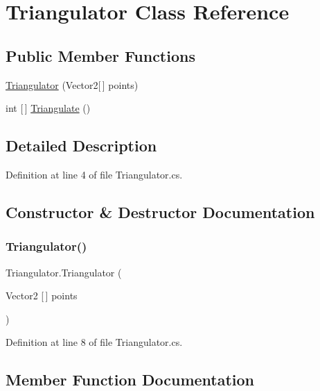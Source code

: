 \hypertarget{class_triangulator}{}\section{Triangulator Class Reference}
\label{class_triangulator}
\subsection*{Public Member Functions}
\begin{DoxyCompactItemize}
\item 
\mbox{\hyperlink{class_triangulator_ac8b7c647942722515ef899f4a36a0b19}{Triangulator}} (Vector2\mbox{[}$\,$\mbox{]} points)
\item 
int \mbox{[}$\,$\mbox{]} \mbox{\hyperlink{class_triangulator_ac7f1cdff8f4aecc3990ca8dd7bdf5ddb}{Triangulate}} ()
\end{DoxyCompactItemize}


\subsection{Detailed Description}


Definition at line 4 of file Triangulator.\+cs.



\subsection{Constructor \& Destructor Documentation}
\mbox{\label{class_triangulator_ac8b7c647942722515ef899f4a36a0b19}} 
\subsubsection{\texorpdfstring{Triangulator()}{Triangulator()}}
{\footnotesize\ttfamily Triangulator.\+Triangulator (\begin{DoxyParamCaption}\item[{Vector2 \mbox{[}$\,$\mbox{]}}]{points }\end{DoxyParamCaption})}



Definition at line 8 of file Triangulator.\+cs.



\subsection{Member Function Documentation}
\mbox{\label{class_triangulator_ac7f1cdff8f4aecc3990ca8dd7bdf5ddb}} 
